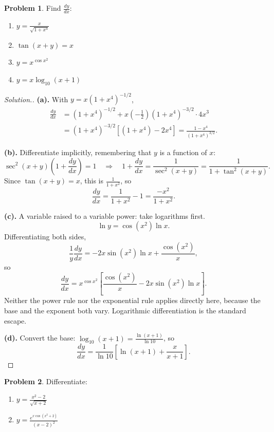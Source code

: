 \documentclass[11pt,a4paper]{article}
\theoremstyle{definition}
\newtheorem{problemx}{Problem}[section]
\newenvironment{problem}{\begin{problemx}}{\end{problemx}}
\newenvironment{solution}
  {\renewcommand{\qedsymbol}{}\begin{proof}[\textit{Solution}.]}
  {\end{proof}}
\begin{document}
\begin{problem}
Find $\frac{dy}{dx}$:
\begin{enumerate}
\item[(a).] $y=\frac{x}{\sqrt{1+x^{4}}}$
\item[(b).] $\tan(x+y)=x$
\item[(c).] $y=x^{\cos x^{2}}$
\item[(d).] $y=x\log_{10}(x+1)$
\end{enumerate}
\end{problem}

\begin{solution}
\textbf{(a).} With $y=x\left(1+x^{4}\right)^{-1/2}$,
\begin{align*}
\frac{dy}{dx} &=\left(1+x^{4}\right)^{-1/2}
   +x\left(-\tfrac{1}{2}\right)\left(1+x^{4}\right)^{-3/2}\cdot 4x^{3}\\
 &=\left(1+x^{4}\right)^{-3/2}\left[\left(1+x^{4}\right)-2x^{4}\right]
  =\frac{1-x^{4}}{\left(1+x^{4}\right)^{3/2}} .
\end{align*}

\textbf{(b).} Differentiate implicitly, remembering that $y$ is a function of $x$:
$$\sec^{2}(x+y)\left(1+\frac{dy}{dx}\right)=1
\quad \Longrightarrow\quad 
1+\frac{dy}{dx}=\frac{1}{\sec^{2}(x+y)}=\frac{1}{1+\tan^{2}(x+y)} .$$
Since $\tan(x+y)=x$, this is $\frac{1}{1+x^{2}}$, so
$$\frac{dy}{dx}=\frac{1}{1+x^{2}}-1=\frac{-x^{2}}{1+x^{2}} .$$

\textbf{(c).} A variable raised to a variable power: take logarithms first.
$$\ln y=\cos\left(x^{2}\right)\ln x .$$
Differentiating both sides,
$$\frac{1}{y}\frac{dy}{dx}
=-2x\sin\left(x^{2}\right)\ln x+\frac{\cos\left(x^{2}\right)}{x},$$
so
$$\frac{dy}{dx}=x^{\cos x^{2}}
\left[\frac{\cos\left(x^{2}\right)}{x}-2x\sin\left(x^{2}\right)\ln x\right].$$
Neither the power rule nor the exponential rule applies directly here, because the
base and the exponent both vary. Logarithmic differentiation is the standard escape.

\textbf{(d).} Convert the base: $\log_{10}(x+1)=\frac{\ln(x+1)}{\ln 10}$, so
$$\frac{dy}{dx}=\frac{1}{\ln 10}\left[\ln(x+1)+\frac{x}{x+1}\right].$$
\end{solution}

\begin{problem}
Differentiate:
\begin{enumerate}
\item[(a).] $y=\frac{x^{2}-2}{\sqrt{x+2}}$
\item[(b).] $y=\frac{e^{x\cos\left(x^{2}+2\right)}}{(x-2)^{2}}$
\end{enumerate}
\end{problem}
\end{document}
